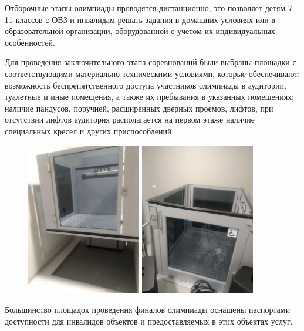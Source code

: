 
Отборочные этапы олимпиады проводятся дистанционно, это позволяет детям 7-11 классов с ОВЗ и инвалидам решать задания в домашних условиях или в образовательной организации, оборудованной с учетом их индивидуальных особенностей.

Для проведения заключительного этапа соревнований были выбраны площадки с соответствующими материально-техническими условиями, которые обеспечивают: возможность беспрепятственного доступа участников олимпиады в аудитории, туалетные и иные помещения, а также их пребывания в указанных помещениях; наличие пандусов, поручней, расширенных дверных проемов, лифтов, при отсутствии лифтов аудитория располагается на первом этаже наличие специальных кресел и других приспособлений. 

\begin{figure}[H]
    \begin{center}
    \includegraphics[width=5cm]{history/info/nano/i2}
    \includegraphics[width=5cm]{history/info/nano/i3}
\end{center}
\end{figure}

Большинство площадок проведения финалов олимпиады оснащены паспортами доступности для инвалидов объектов и предоставляемых в этих объектах услуг.

